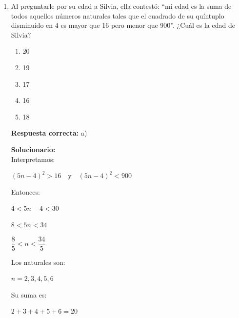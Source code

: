 \begin{enumerate}
	\vspace{2mm}
	\textbf{Solucionario:}\\
	En la izquierda, $n-1=2\Rightarrow n=3$:
	
	$\boxed{\begin{matrix} 10\\ 1 \end{matrix}}X^2=\dfrac13(10^3-1^3)=\dfrac{999}{3}=333$
	
	En la derecha, $n-1=1\Rightarrow n=2$:
	
	$\boxed{\begin{matrix} m\\ \sqrt{10} \end{matrix}}X=\dfrac12(m^2-10)$
	
	Igualando:
	
	$\dfrac12(m^2-10)=333$
	
	$m^2-10=666$
	
	$m^2=676 \Rightarrow m=26$
	
	
	\vspace{6mm}
	
	\item Al preguntarle por su edad a Silvia, ella contestó: “mi edad es la suma de todos aquellos números naturales tales que el cuadrado de su quíntuplo disminuido en 4 es mayor que 16 pero menor que 900”. ¿Cuál es la edad de Silvia?
	\begin{enumerate}[label=\alph*)]
		\item 20
		\item 19
		\item 17
		\item 16
		\item 18
	\end{enumerate}
	\textbf{Respuesta correcta:} a)
	
	\vspace{2mm}
	\textbf{Solucionario:}\\
	Interpretamos:
	
	$(5n-4)^2>16 \quad \text{y}\quad (5n-4)^2<900$
	
	Entonces:
	
	$4<5n-4<30$
	
	$8<5n<34$
	
	$\dfrac85<n<\dfrac{34}{5}$
	
	Los naturales son:
	
	$n=2,3,4,5,6$
	
	Su suma es:
	
	$2+3+4+5+6=20$
	

\end{enumerate}
